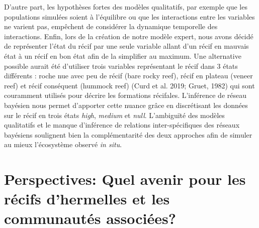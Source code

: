 \documentclass[12pt]{report}
\begin{document}
\newline\newline
D’autre part, les hypothèses fortes des modèles qualitatifs, par exemple que les populations simulées soient à l’équilibre ou que les interactions entre les variables ne varient pas, empêchent de considérer la dynamique temporelle des interactions. Enfin, lors de la création de notre modèle expert, nous avons décidé de représenter l’état du récif par une seule variable allant d’un récif en mauvais état à un récif en bon état afin de la simplifier au maximum. 
Une alternative possible aurait été d’utiliser trois variables représentant le récif dans 3 états différents : roche nue avec peu de récif (bare rocky reef), récif en plateau (veneer reef) et récif conséquent (hummock reef) (Curd et al. 2019; Gruet, 1982) qui sont couramment utilisés pour décrire les formations récifales. L’inférence de réseau bayésien nous permet d’apporter cette nuance grâce en discrétisant les données sur le récif en trois états \textit{high}, \textit{medium} et \textit{null}.
\newline\newline
L'ambiguïté des modèles qualitatifs et le manque d'inférence de relations inter-spécifiques des réseaux bayésiens soulignent bien la complémentarité des deux approches afin de simuler au mieux l'écosystème observé \textit{in situ}.


        \section{Perspectives: Quel avenir pour les récifs d'hermelles et les communautés associées?}
\end{document}
